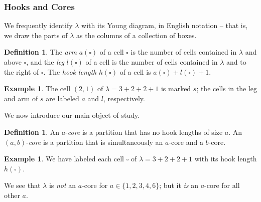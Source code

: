\documentclass{amsart}[12pt]
\theoremstyle{definition}
\newtheorem{example}[dummy]{Example}
\newtheorem{definition}[dummy]{Definition}
\begin{document}
\subsubsection{Hooks and Cores}
We frequently identify $\lambda$ with its Young diagram, in
English notation -- that is, we draw the parts of $\lambda$ as
the columns of a collection of boxes.
\begin{definition}
The \emph{arm} $a(\square)$ of a cell $\square$ is the number of cells contained in $\lambda$ and above $\square$, and the \emph{leg} $l(\square)$ of a cell is the number of cells contained in $\lambda$ and to the right of $\square$.
The \emph{hook length} $h(\square)$ of a cell is $a(\square)+l(\square)+1$.
\end{definition}
\begin{example}
The cell $(2,1)$ of $\lambda=3+2+2+1$ is marked $s$; the cells in the
leg and arm of $s$ are labeled $a$ and $l$, respectively.
\begin{center}
\end{center}
\end{example}
We now introduce our main object of study.
\begin{definition}
An $a$-\emph{core} is a partition that has no hook lengths of size $a$. An $(a,b)$-\emph{core} is a partition that is simultaneously an $a$-core and a $b$-core.
\end{definition}
\begin{example}
We have labeled each cell $\square$ of $\lambda=3+2+2+1$ with its hook length $h(\square)$.
\begin{center}
\end{center}
We see that $\lambda$ is \emph{not} an $a$-core for $a\in \{1,2,3,4,6\}$;
but it \emph{is} an $a$-core for all other $a$.
\end{example}
\end{document}
